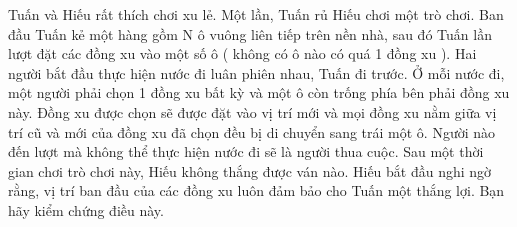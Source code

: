 Tuấn và Hiếu rất thích chơi xu lẻ. Một lần, Tuấn rủ Hiếu chơi một trò chơi. Ban đầu Tuấn kẻ một hàng gồm N ô vuông liên tiếp trên nền nhà, sau đó Tuấn lần lượt đặt các đồng xu vào một số ô ( không có ô nào có quá 1 đồng xu ). Hai người bắt đầu thực hiện nước đi luân phiên nhau, Tuấn đi trước. Ở mỗi nước đi, một người phải chọn 1 đồng xu bất kỳ và một ô còn trống phía bên phải đồng xu này. Đồng xu được chọn sẽ được đặt vào vị trí mới và mọi đồng xu nằm giữa vị trí cũ và mới của đồng xu đã chọn đều bị di chuyển sang trái một ô. Người nào đến lượt mà không thể thực hiện nước đi sẽ là người thua cuộc. Sau một thời gian chơi trò chơi này, Hiếu không thắng được ván nào. Hiếu bắt đầu nghi ngờ rằng, vị trí ban đầu của các đồng xu luôn đảm bảo cho Tuấn một thắng lợi. Bạn hãy kiểm chứng điều này.